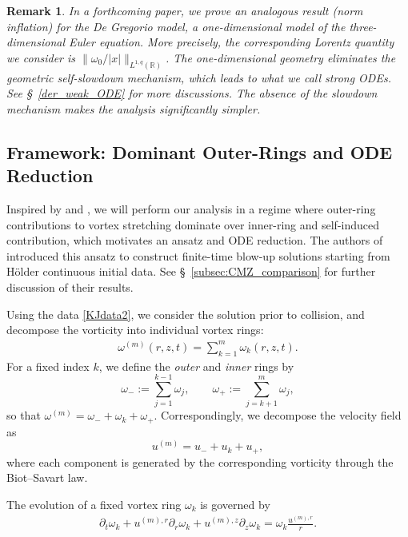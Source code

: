 \documentclass[reqno,11pt]{amsart}
\newtheorem{remark}{Remark}[section]
\begin{document}
\begin{remark}
\label{rem_DeG}
In a forthcoming paper, we prove an analogous result (norm inflation) for the De Gregorio model, a one-dimensional model of the three-dimensional  Euler equation. More precisely, the corresponding Lorentz quantity we consider is  $\|\omega_0/|x|\|_{L^{1,q}(\mathbb{R})}$. The one-dimensional geometry eliminates the geometric self-slowdown mechanism, which leads to what we call \emph{strong ODEs}. See \S~\ref{der_weak_ODE} for more discussions. The absence of the slowdown mechanism makes the analysis significantly simpler. 
\end{remark}








\subsection{Framework: Dominant Outer-Rings and ODE Reduction}
\label{sec:framework}

Inspired by \cite{KimJeong22} and \cite{CordobaMartinezZheng25}, we will perform our analysis in a regime where outer-ring contributions to vortex stretching dominate over inner-ring and self-induced contribution, which motivates an ansatz and ODE reduction.
The authors of \cite{CordobaMartinezZheng25} introduced this ansatz to construct finite-time blow-up solutions starting from H\"older continuous initial data. See \S~\ref{subsec:CMZ_comparison} for further discussion of their results.


Using the  data \eqref{KJdata2}, we consider the solution prior to collision, and decompose the vorticity into individual vortex rings:
\begin{align*}
    \omega^{(m)}(r,z,t) = \sum_{k=1}^m \omega_k(r,z,t).
\end{align*}
For a fixed index $k$, we define the \emph{outer} and \emph{inner} rings by
\[
    \omega_- := \sum_{j=1}^{k-1} \omega_j,
    \qquad
    \omega_+ := \sum_{j=k+1}^{m} \omega_j,
\]
so that $\omega^{(m)} = \omega_- + \omega_k + \omega_+$. Correspondingly, we decompose the velocity field as
\[
    u^{(m)} = u_- + u_k + u_+,
\]
where each component is generated by the corresponding vorticity through the Biot--Savart law.

The evolution of a fixed vortex ring $\omega_k$ is governed by
\begin{align}
\label{vor_k}
    \partial_t \omega_k
    + u^{(m),r} \partial_r \omega_k
    + u^{(m),z} \partial_z \omega_k
    =
    \omega_k \frac{u^{(m),r}}{r}.
\end{align}
\end{document}
